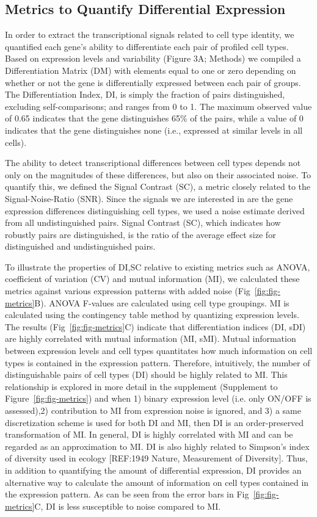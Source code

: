 \subsection{Metrics to Quantify Differential Expression}
In order to extract the transcriptional signals related to cell type identity, we quantified each gene's ability to differentiate each pair of profiled cell types. Based on expression levels and variability (Figure 3A; Methods) we compiled a Differentiation Matrix (DM) with elements equal to one or zero depending on whether or not the gene is differentially expressed between each pair of groups. The Differentiation Index, DI, is simply the fraction of pairs distinguished, excluding self-comparisons; and ranges from 0 to 1. The maximum observed value of 0.65 indicates that the gene distinguishes 65\% of the pairs, while a value of 0 indicates that the gene distinguishes none (i.e., expressed at similar levels in all cells). 

The ability to detect transcriptional differences between cell types depends not only on the magnitudes of these differences, but also on their associated noise. To quantify this, we defined the Signal Contrast (SC), a metric closely related to the Signal-Noise-Ratio (SNR). Since the signals we are interested in are the gene expression differences distinguishing cell types, we used a noise estimate derived from all undistinguished pairs. Signal Contrast (SC), which indicates how robustly pairs are distinguished, is the ratio of the average effect size for distinguished and undistinguished pairs. 

To illustrate the properties of DI,SC relative to existing metrics such as ANOVA, coefficient of variation (CV) and mutual information (MI), we calculated these metrics against various expression patterns with added noise (Fig~\ref{fig:fig-metrics}B). ANOVA F-values are calculated using cell type groupings. MI is calculated using the contingency table method by quantizing expression levels. 
The results (Fig~\ref{fig:fig-metrics}C) indicate that differentiation indices (DI, sDI) are highly correlated with mutual information (MI, sMI). Mutual information between expression levels and cell types quantitates how much information on cell types is contained in the expression pattern. Therefore, intuitively, the number of distinguishable pairs of cell types (DI) should be highly related to MI. This relationship is explored in more detail in the supplement (Supplement to Figure~\ref{fig:fig-metrics}) and when 1) binary expression level (i.e. only ON/OFF is assessed),2) contribution to MI from expression noise is ignored, and 3) a same discretization scheme is used for both DI and MI, then DI is an order-preserved transformation of MI. In general, DI is highly correlated with MI and can be regarded as an approximation to MI. DI is also highly related to Simpson's index of diversity used in ecology [REF:1949 Nature, Measurement of Diversity]. Thus, in addition to quantifying the amount of differential expression, DI provides an alternative way to calculate the amount of information on cell types contained in the expression pattern. As can be seen from the error bars in Fig~\ref{fig:fig-metrics}C, DI is less susceptible to noise compared to MI. 

